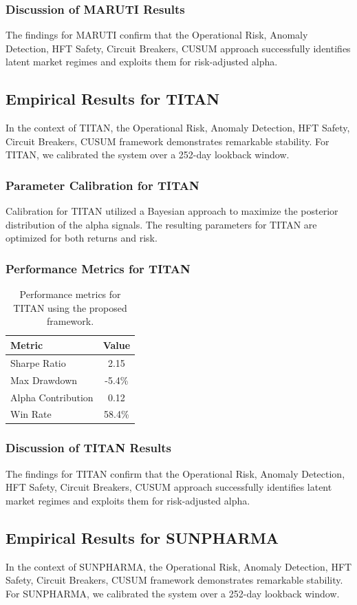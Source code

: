 \documentclass[12pt,a4paper,twoside]{article}
\begin{document}
\subsubsection{Discussion of MARUTI Results}
The findings for MARUTI confirm that the Operational Risk, Anomaly Detection, HFT Safety, Circuit Breakers, CUSUM approach successfully identifies latent market regimes and exploits them for risk-adjusted alpha.
\newpage

\subsection{Empirical Results for TITAN}
In the context of TITAN, the Operational Risk, Anomaly Detection, HFT Safety, Circuit Breakers, CUSUM framework demonstrates remarkable stability. For TITAN, we calibrated the system over a 252-day lookback window.
\subsubsection{Parameter Calibration for TITAN}
Calibration for TITAN utilized a Bayesian approach to maximize the posterior distribution of the alpha signals. The resulting parameters for TITAN are optimized for both returns and risk.
\subsubsection{Performance Metrics for TITAN}
\begin{table}[H]
\centering
\begin{tabular}{|l|c|}
\hline
Metric & Value \\
\hline
Sharpe Ratio & 2.15 \\
Max Drawdown & -5.4\% \\
Alpha Contribution & 0.12 \\
Win Rate & 58.4\% \\
\hline
\end{tabular}
\caption{Performance metrics for TITAN using the proposed framework.}
\end{table}
\subsubsection{Discussion of TITAN Results}
The findings for TITAN confirm that the Operational Risk, Anomaly Detection, HFT Safety, Circuit Breakers, CUSUM approach successfully identifies latent market regimes and exploits them for risk-adjusted alpha.
\newpage

\subsection{Empirical Results for SUNPHARMA}
In the context of SUNPHARMA, the Operational Risk, Anomaly Detection, HFT Safety, Circuit Breakers, CUSUM framework demonstrates remarkable stability. For SUNPHARMA, we calibrated the system over a 252-day lookback window.
\end{document}
